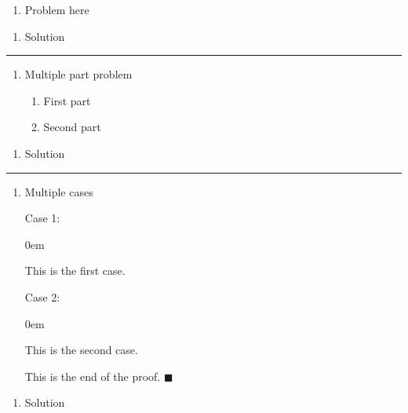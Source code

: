 \documentclass{article}
\newcommand{\qed}{\hfill$\blacksquare$}
\newenvironment{problem}[1]    %
{
	\begin{enumerate}[leftmargin = 0in]
		\item[\bfseries{#1}]
}
{	\end{enumerate}
}
\newenvironment{multipart}
{
	\begin{enumerate}[leftmargin = *, align = left, label = {\alph*.}, topsep = 0pt]
}	
{
	\end{enumerate}
}
\newenvironment{proofcase}[1]
{
	\par
	#1
	\begin{addmargin}[1em]{0em}
}
{	
	\end{addmargin}
}
\newenvironment{solution}    %
{
	\begin{enumerate}[leftmargin = 0in]
		\item[\bfseries{Solution}]
}
{
	\end{enumerate}
}
\begin{document}
	\begin{problem}{4.3.14}
		Problem here
	\end{problem}
	
	\begin{solution}
		Solution
	\end{solution}
	
\hrule %

	\begin{problem}{4.3.22}
		Multiple part problem
		\begin{multipart}
			\item First part
			\item Second part
		\end{multipart}
	\end{problem}

	\begin{solution}
		Solution
	\end{solution}
	
\hrule %

	\begin{problem}{4.6.20}
		Multiple cases
		\begin{proofcase}{Case 1:}
			This is the first case.
		\end{proofcase}
		\begin{proofcase}{Case 2:}
			This is the second case.
		\end{proofcase}
		This is the end of the proof. \qed
	\end{problem}

	\begin{solution}
		Solution
	\end{solution}
	
\end{document}
